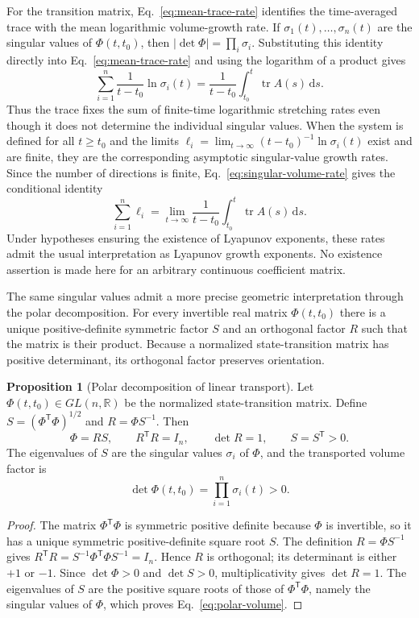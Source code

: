 \documentclass[11pt,a4paper]{article}
\newcommand{\be}{\begin{equation}}
\newcommand{\ee}{\end{equation}}
\newcommand{\lb}[1]{\label{#1}}
\newcommand{\dd}{\mathrm{d}}
\newcommand{\R}{\mathbb{R}}
\DeclareMathOperator{\tr}{tr}
\theoremstyle{definition}
\newtheorem{proposition}{Proposition}[section]
\numberwithin{equation}{section}
\begin{document}
For the transition matrix, Eq.~\eqref{eq:mean-trace-rate} identifies the time-averaged trace with the mean logarithmic volume-growth rate. If $\sigma_1(t),\ldots,\sigma_n(t)$ are the singular values of $\Phi(t,t_0)$, then $|\det\Phi|=\prod_i\sigma_i$. Substituting this identity directly into Eq.~\eqref{eq:mean-trace-rate} and using the logarithm of a product gives
\be
\sum_{i=1}^{n}
\frac{1}{t-t_0}\ln\sigma_i(t)
=
\frac{1}{t-t_0}\int_{t_0}^{t}\tr A(s)\,\dd s.
\lb{eq:singular-volume-rate}
\ee
Thus the trace fixes the sum of finite-time logarithmic stretching rates even though it does not determine the individual singular values. When the system is defined for all $t\geq t_0$ and the limits $\ell_i=\lim_{t\to\infty}(t-t_0)^{-1}\ln\sigma_i(t)$ exist and are finite, they are the corresponding asymptotic singular-value growth rates. Since the number of directions is finite, Eq.~\eqref{eq:singular-volume-rate} gives the conditional identity
\be
\sum_{i=1}^{n}\ell_i
=\lim_{t\to\infty}\frac{1}{t-t_0}
\int_{t_0}^{t}\tr A(s)\,\dd s.
\lb{eq:lyapunov-sum}
\ee
Under hypotheses ensuring the existence of Lyapunov exponents, these rates admit the usual interpretation as Lyapunov growth exponents. No existence assertion is made here for an arbitrary continuous coefficient matrix.

The same singular values admit a more precise geometric interpretation through the polar decomposition. For every invertible real matrix $\Phi(t,t_0)$ there is a unique positive-definite symmetric factor $S$ and an orthogonal factor $R$ such that the matrix is their product. Because a normalized state-transition matrix has positive determinant, its orthogonal factor preserves orientation.

\begin{proposition}[Polar decomposition of linear transport]
Let $\Phi(t,t_0)\in GL(n,\R)$ be the normalized state-transition matrix. Define $S=(\Phi^{\mathsf T}\Phi)^{1/2}$ and $R=\Phi S^{-1}$. Then
\be
\Phi=RS,\qquad R^{\mathsf T}R=I_n,\qquad\det R=1,\qquad S=S^{\mathsf T}>0.
\lb{eq:transition-polar}
\ee
The eigenvalues of $S$ are the singular values $\sigma_i$ of $\Phi$, and the transported volume factor is
\be
\det\Phi(t,t_0)=\prod_{i=1}^{n}\sigma_i(t)>0.
\lb{eq:polar-volume}
\ee
\end{proposition}

\begin{proof}
The matrix $\Phi^{\mathsf T}\Phi$ is symmetric positive definite because $\Phi$ is invertible, so it has a unique symmetric positive-definite square root $S$. The definition $R=\Phi S^{-1}$ gives $R^{\mathsf T}R=S^{-1}\Phi^{\mathsf T}\Phi S^{-1}=I_n$. Hence $R$ is orthogonal; its determinant is either $+1$ or $-1$. Since $\det\Phi>0$ and $\det S>0$, multiplicativity gives $\det R=1$. The eigenvalues of $S$ are the positive square roots of those of $\Phi^{\mathsf T}\Phi$, namely the singular values of $\Phi$, which proves Eq.~\eqref{eq:polar-volume}.
\end{proof}
\end{document}
